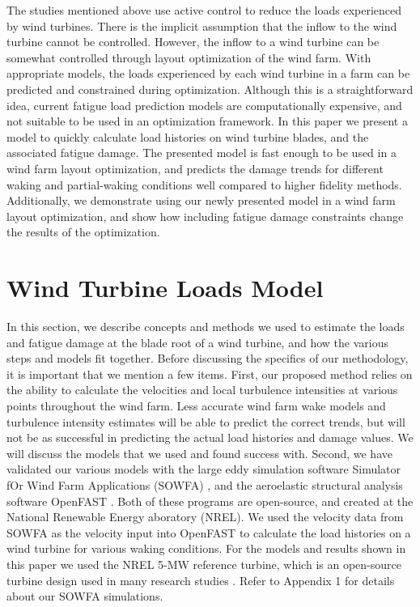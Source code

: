\documentclass[11pt,letterpaper]{article}
\begin{document}
The studies mentioned above use active control to reduce the loads experienced by wind turbines. There is the implicit assumption that the inflow to the wind turbine cannot be controlled. However, the inflow to a wind turbine can be somewhat controlled through layout optimization of the wind farm. With appropriate models, the loads experienced by each wind turbine in a farm can be predicted and constrained during optimization. 
Although this is a straightforward idea, current fatigue load prediction models are computationally expensive, and not suitable to be used in an optimization framework.
% 
In this paper we present a model to quickly calculate load histories on wind turbine blades, and the associated fatigue damage. The presented model is fast enough to be used in a wind farm layout optimization, and predicts the damage trends for different waking and partial-waking conditions well compared to higher fidelity methods. 
% 
Additionally, we demonstrate using our newly presented model in a wind farm layout optimization, and show how including fatigue damage constraints change the results of the optimization.

% 
% 

\section{Wind Turbine Loads Model}
\label{sec1}
In this section, we describe concepts and methods we used to estimate the loads and fatigue damage at the blade root of a wind turbine, and how the various steps and models fit together. 
% 
Before discussing the specifics of our methodology, it is important that we mention a few items. 
First, our proposed method relies on the ability to calculate the velocities and local turbulence intensities at various points throughout the wind farm. Less accurate wind farm wake models and turbulence intensity estimates will be able to predict the correct trends, but will not be as successful in predicting the actual load histories and damage values. We will discuss the models that we used and found success with. 
Second, we have validated our various models with the large eddy simulation software Simulator fOr Wind Farm Applications (SOWFA) \cite{churchfield2012nwtc}, and the aeroelastic structural analysis software OpenFAST \cite{openfast_docs}. Both of these programs are open-source, and created at the National Renewable Energy aboratory (NREL). We used the velocity data from SOWFA as the velocity input into OpenFAST to calculate the load histories on a wind turbine for various waking conditions. For the models and results shown in this paper we used the NREL 5-MW reference turbine, which is an open-source turbine design used in many research studies \cite{jonkman2009definition}.
Refer to Appendix 1 for details about our SOWFA simulations.
\end{document}
